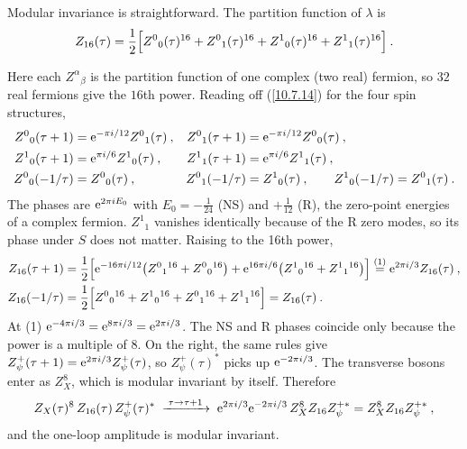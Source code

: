 Modular invariance is straightforward. The partition function of $\lambda$ is
\begin{equation}
	Z_{16}(\tau)= \frac{1}{2}\Bigl[
	Z^{0}{}_{0}(\tau)^{16}+ Z^{0}{}_{1}(\tau)^{16}+Z^{1}{}_{0}(\tau)^{16}+Z^{1}{}_{1}(\tau)^{16}
	\Bigr] \:. \label{11.2.13}
\end{equation}
\begin{tcolorbox}[breakable]
	\begin{remark}
		Here each $Z^{\alpha}{}_{\beta}$ is the partition function of one complex (two real) fermion, so $32$ real fermions give the $16$th power. Reading off (\ref{10.7.14}) for the four spin structures,
		\begin{align*}
			Z^{0}{}_{0}(\tau+1)&=\mathrm{e}^{-\pi i/12}Z^{0}{}_{1}(\tau)\:,& Z^{0}{}_{1}(\tau+1)&=\mathrm{e}^{-\pi i/12}Z^{0}{}_{0}(\tau)\:,\\
			Z^{1}{}_{0}(\tau+1)&=\mathrm{e}^{\pi i/6}Z^{1}{}_{0}(\tau)\:,& Z^{1}{}_{1}(\tau+1)&=\mathrm{e}^{\pi i/6}Z^{1}{}_{1}(\tau)\:,\\
			Z^{0}{}_{0}(-1/\tau)&=Z^{0}{}_{0}(\tau)\:,& Z^{0}{}_{1}(-1/\tau)&=Z^{1}{}_{0}(\tau)\:,\qquad Z^{1}{}_{0}(-1/\tau)=Z^{0}{}_{1}(\tau)\:.
		\end{align*}
		The phases are $\mathrm{e}^{2\pi i E_{0}}$ with $E_{0}=-\frac{1}{24}$ (NS) and $+\frac{1}{12}$ (R), the zero-point energies of a complex fermion. $Z^{1}{}_{1}$ vanishes identically because of the R zero modes, so its phase under $S$ does not matter. Raising to the 16th power,
		\begin{align*}
			Z_{16}(\tau+1)&=\frac{1}{2}\Bigl[\mathrm{e}^{-16\pi i/12}\bigl(Z^{0}{}_{1}{}^{16}+Z^{0}{}_{0}{}^{16}\bigr)+\mathrm{e}^{16\pi i/6}\bigl(Z^{1}{}_{0}{}^{16}+Z^{1}{}_{1}{}^{16}\bigr)\Bigr]
			\overset{(1)}{=}\mathrm{e}^{2\pi i/3}Z_{16}(\tau)\:,\\
			Z_{16}(-1/\tau)&=\frac{1}{2}\Bigl[Z^{0}{}_{0}{}^{16}+Z^{1}{}_{0}{}^{16}+Z^{0}{}_{1}{}^{16}+Z^{1}{}_{1}{}^{16}\Bigr]=Z_{16}(\tau)\:.
		\end{align*}
		At (1) $\mathrm{e}^{-4\pi i/3}=\mathrm{e}^{8\pi i/3}=\mathrm{e}^{2\pi i/3}$. The NS and R phases coincide only because the power is a multiple of 8. On the right, the same rules give $Z_{\psi}^{+}(\tau+1)=\mathrm{e}^{2\pi i/3}Z_{\psi}^{+}(\tau)$, so $Z_{\psi}^{+}(\tau)^{\ast}$ picks up $\mathrm{e}^{-2\pi i/3}$. The transverse bosons enter as $Z_{X}^{8}$, which is modular invariant by itself. Therefore
		\begin{equation*}
			Z_{X}(\tau)^{8}\,Z_{16}(\tau)\,Z_{\psi}^{+}(\tau)^{\ast}\;\xrightarrow{\;\tau\to\tau+1\;}\;\mathrm{e}^{2\pi i/3}\mathrm{e}^{-2\pi i/3}\,Z_{X}^{8}Z_{16}Z_{\psi}^{+\ast}=Z_{X}^{8}Z_{16}Z_{\psi}^{+\ast}\:,
		\end{equation*}
		and the one-loop amplitude is modular invariant.
	\end{remark}
\end{tcolorbox}

